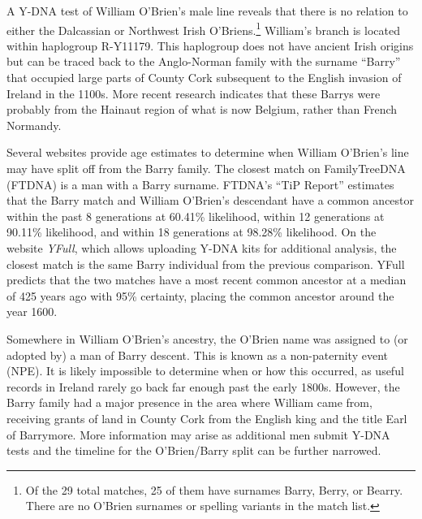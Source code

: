 A Y-DNA test of William O'Brien's male line\cite{BigY} reveals that there is no relation to either the Dalcassian or Northwest Irish O'Briens.\footnote{Of the 29 total matches, 25 of them have surnames Barry, Berry, or Bearry. There are no O'Brien surnames or spelling variants in the match list.} William's branch is located within haplogroup R-Y11179. This haplogroup does not have ancient Irish origins but can be traced back to the Anglo-Norman family with the surname ``Barry'' that occupied large parts of County Cork subsequent to the English invasion of Ireland in the 1100s.\cite{BarrymoreDNA:9} More recent research indicates that these Barrys were probably from the Hainaut region of what is now Belgium, rather than French Normandy.\cite{BarrymoreDNA:2-4}

Several websites provide age estimates to determine when William O'Bri\-en's line may have split off from the Barry family. The closest match on FamilyTreeDNA (FTDNA) is a man with a Barry surname. FTDNA's ``TiP Report'' estimates that the Barry match and William O'Brien's descendant have a common ancestor within the past 8 generations at 60.41\% likelihood, within 12 generations at 90.11\% likelihood, and within 18 generations at 98.28\% likelihood.\cite{TiP} On the website \textit{YFull}, which allows uploading Y-DNA kits for additional analysis, the closest match is the same Barry individual from the previous comparison. YFull predicts that the two matches have a most recent common ancestor at a median of 425 years ago with 95\% certainty, placing the common ancestor around the year 1600.\cite{YFull}

Somewhere in William O'Brien's ancestry, the O'Brien name was assigned to (or adopted by) a man of Barry descent. This is known as a non-paternity event (NPE). It is likely impossible to determine when or how this occurred, as useful records in Ireland rarely go back far enough past the early 1800s. However, the Barry family had a major presence in the area where William came from, receiving grants of land in County Cork from the English king and the title Earl of Barrymore.\cite{BarrymoreDNA:4} More information may arise as additional men submit Y-DNA tests and the timeline for the O'Brien/Barry split can be further narrowed.

